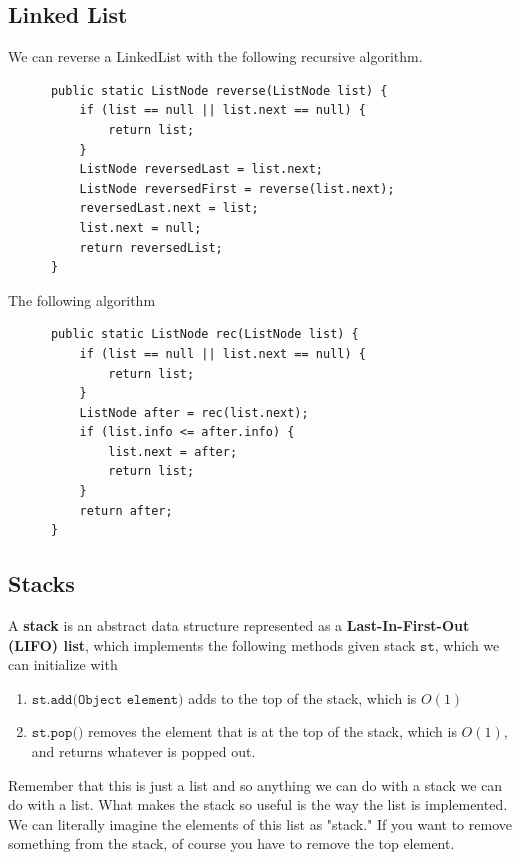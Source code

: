\documentclass{article}
\begin{document}
  \subsection{Linked List}

    \begin{example}[Reverse]
      We can reverse a LinkedList with the following recursive algorithm. 
      \begin{lstlisting}
      public static ListNode reverse(ListNode list) {
          if (list == null || list.next == null) {
              return list; 
          }
          ListNode reversedLast = list.next; 
          ListNode reversedFirst = reverse(list.next); 
          reversedLast.next = list; 
          list.next = null; 
          return reversedList; 
      }
      \end{lstlisting}
    \end{example}

    \begin{example}
      The following algorithm 
      \begin{lstlisting}
      public static ListNode rec(ListNode list) {
          if (list == null || list.next == null) {
              return list; 
          }
          ListNode after = rec(list.next); 
          if (list.info <= after.info) {
              list.next = after; 
              return list; 
          }
          return after; 
      }
      \end{lstlisting}
    \end{example}

  \subsection{Stacks}

    \begin{definition}[Stack]
      A \textbf{stack} is an abstract data structure represented as a \textbf{Last-In-First-Out (LIFO) list}, which implements the following methods given stack $\texttt{st}$, which we can initialize with 
      \begin{enumerate}
        \item $\texttt{st.add(Object element)}$ adds to the top of the stack, which is $O(1)$ 
        \item $\texttt{st.pop()}$ removes the element that is at the top of the stack, which is $O(1)$, and returns whatever is popped out. 
      \end{enumerate}
      Remember that this is just a list and so anything we can do with a stack we can do with a list. What makes the stack so useful is the way the list is implemented. We can literally imagine the elements of this list as "stack." If you want to remove something from the stack, of course you have to remove the top element. 
    \end{definition}
\end{document}
